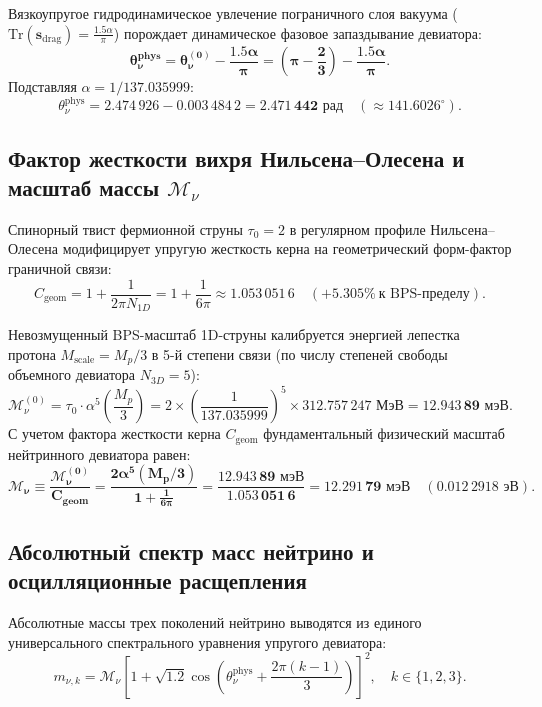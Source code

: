 \documentclass[11pt,a4paper]{article}
\theoremstyle{definition}
\theoremstyle{remark}
\begin{document}
Вязкоупругое гидродинамическое увлечение пограничного слоя вакуума ($\mathrm{Tr}(\mathbf{s}_{\text{drag}}) = \frac{1.5\alpha}{\pi}$) порождает динамическое фазовое запаздывание девиатора:
\begin{equation}
	\mathbf{\theta_\nu^{\text{phys}} = \theta_\nu^{(0)} - \frac{1.5\alpha}{\pi} = \left(\pi - \frac{2}{3}\right) - \frac{1.5\alpha}{\pi}}.
\end{equation}
Подставляя $\alpha = 1/137.035999$:
\begin{equation}
	\theta_\nu^{\text{phys}} = 2.474\,926 - 0.003\,484\,2 = \mathbf{2.471\,442 \text{ рад}} \quad (\approx 141.6026^\circ).
\end{equation}

\subsection{Фактор жесткости вихря Нильсена--Олесена и масштаб массы $\mathcal{M}_\nu$}
Спинорный твист фермионной струны $\tau_0 = 2$ в регулярном профиле Нильсена--Олесена модифицирует упругую жесткость керна на геометрический форм-фактор граничной связи:
\begin{equation}
	C_{\text{geom}} = 1 + \frac{1}{2\pi N_{1D}} = 1 + \frac{1}{6\pi} \approx 1.053\,051\,6 \quad (\mathbf{+5.305\%} \ \text{к BPS-пределу}).
\end{equation}

Невозмущенный BPS-масштаб 1D-струны калибруется энергией лепестка протона $M_{\text{scale}} = M_p/3$ в 5-й степени связи (по числу степеней свободы объемного девиатора $N_{3D}=5$):
\begin{equation}
	\mathcal{M}_\nu^{(0)} = \tau_0 \cdot \alpha^5 \left( \frac{M_p}{3} \right) = 2 \times \left(\frac{1}{137.035999}\right)^5 \times 312.757\,247 \text{ МэВ} = \mathbf{12.943\,89 \text{ мэВ}}.
\end{equation}
С учетом фактора жесткости керна $C_{\text{geom}}$ фундаментальный физический масштаб нейтринного девиатора равен:
\begin{equation}
	\mathbf{\mathcal{M}_\nu \equiv \frac{\mathcal{M}_\nu^{(0)}}{C_{\text{geom}}} = \frac{2 \alpha^5 (M_p / 3)}{1 + \frac{1}{6\pi}} = \frac{12.943\,89 \text{ мэВ}}{1.053\,051\,6} = \mathbf{12.291\,79 \text{ мэВ}}} \quad (0.012\,2918 \text{ эВ}).
\end{equation}

\subsection{Абсолютный спектр масс нейтрино и осцилляционные расщепления}
Абсолютные массы трех поколений нейтрино выводятся из единого универсального спектрального уравнения упругого девиатора:
\begin{equation}
	m_{\nu, k} = \mathcal{M}_\nu \left[ 1 + \sqrt{1.2} \cos\left( \theta_\nu^{\text{phys}} + \frac{2\pi(k-1)}{3} \right) \right]^2, \quad k \in \{1, 2, 3\}.
\end{equation}
\end{document}
